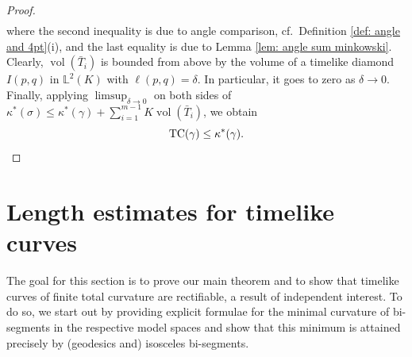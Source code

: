 \documentclass[hidelinks,12pt,a4paper]{article}
\numberwithin{equation}{section}
\theoremstyle{plain}
\theoremstyle{definition}
\DeclareMathOperator{\TC}{TC}
\DeclareMathOperator{\vol}{vol}
\newcommand{\lm}[1]{\mathbb{L}^2(#1)}
\begin{document}
\begin{proof}
\begin{align*}
\end{align*}
where the second inequality is due to angle comparison, cf.\ Definition \ref{def: angle and 4pt}(i), and the last equality is due to Lemma \ref{lem: angle sum minkowski}. 
Clearly, $\vol(\bar T_i)$ is bounded from above by the volume of a timelike diamond $I(p,q)$ in $\lm{K}$ with $\ell(p,q)=\delta$. 
In particular, it goes to zero as $\delta \to 0$. 
Finally, applying $\limsup_{\delta \to 0}$ on both sides of $\kappa^*(\sigma)  \leq \kappa^*(\gamma) + \sum_{i=1}^{m-1} K\vol(\bar T_i)$, we obtain
\begin{equation*}
\TC(\gamma) \leq \kappa^*(\gamma). \qedhere
\end{equation*}
\end{proof}

\section{Length estimates for timelike curves} 
The goal for this section is to prove our main theorem and to show that timelike curves of finite total curvature are rectifiable, a result of independent interest.
To do so, we start out by providing explicit formulae for the minimal curvature of bi-segments in the respective model spaces and show that this minimum is attained precisely by (geodesics and) isosceles bi-segments.
\end{document}
